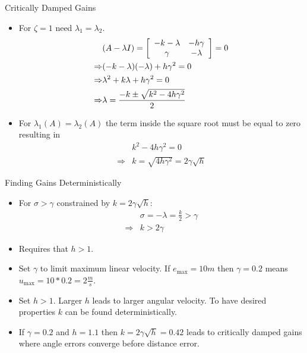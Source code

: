 \documentclass[hyperref={pdfpagelabels=false}]{beamer}
\begin{document}
\begin{frame}{Critically Damped Gains}
\begin{itemize}
\item For $\zeta=1$ need $\lambda_1=\lambda_2$.
\begin{align*}
&(A-\lambda I) = \left[\begin{array}{c c} -k-\lambda & -h\gamma \\ \gamma & -\lambda\end{array}\right] = 0 \\
\Rightarrow &(-k-\lambda)(-\lambda)+h\gamma^2 = 0 \\
\Rightarrow &\lambda^2 + k\lambda + h\gamma^2 = 0 \\
\Rightarrow &\lambda = \frac{-k\pm\sqrt{k^2-4h\gamma^2}}{2}
\end{align*}
\item For $\lambda_1(A)=\lambda_2(A)$ the term inside the square root must be equal to zero resulting in
\begin{align*}
&k^2 - 4h\gamma^2 = 0 \\
\Rightarrow &k = \sqrt{4h\gamma^2} = 2\gamma\sqrt{h}
\end{align*}
\end{itemize}
\end{frame}

\begin{frame}{Finding Gains Deterministically}
\begin{itemize}
\item For $\sigma>\gamma$ constrained by $k=2\gamma\sqrt{h}$:
\begin{align*}
&\sigma = -\lambda = \tfrac{k}{2} > \gamma \\
\Rightarrow &k > 2\gamma
\end{align*}
\item Requires that $h>1$.
\item Set $\gamma$ to limit maximum linear velocity. If $e_\text{max}=10m$ then $\gamma=0.2$ means $u_\text{max}=10*0.2=2\tfrac{m}{s}$.
\item Set $h>1$. Larger $h$ leads to larger angular velocity. To have desired properties $k$ can be found deterministically.
\item If $\gamma = 0.2$ and $h=1.1$ then $k=2\gamma\sqrt{h}=0.42$ leads to critically damped gains where angle errors converge before distance error.
\end{itemize}
\end{frame}
\end{document}
